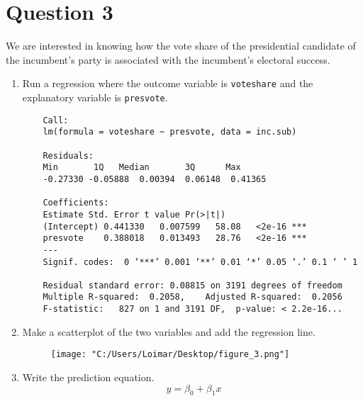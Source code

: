 \documentclass[12pt,letterpaper]{article}
\begin{document}
	\newpage	
\section*{Question 3}

\noindent We are interested in knowing how the vote share of the presidential candidate of the incumbent's party is associated with the incumbent's electoral success.
	\vspace{.25cm}
	\begin{enumerate}
		\item Run a regression where the outcome variable is \texttt{voteshare} and the explanatory variable is \texttt{presvote}.
		
		\begin{BVerbatim}
	Call:
	lm(formula = voteshare ~ presvote, data = inc.sub)
	
	Residuals:
	Min       1Q   Median       3Q      Max 
	-0.27330 -0.05888  0.00394  0.06148  0.41365 
	
	Coefficients:
	Estimate Std. Error t value Pr(>|t|)    
	(Intercept) 0.441330   0.007599   58.08   <2e-16 ***
	presvote    0.388018   0.013493   28.76   <2e-16 ***
	---
	Signif. codes:  0 ‘***’ 0.001 ‘**’ 0.01 ‘*’ 0.05 ‘.’ 0.1 ‘ ’ 1
	
	Residual standard error: 0.08815 on 3191 degrees of freedom
	Multiple R-squared:  0.2058,	Adjusted R-squared:  0.2056 
	F-statistic:   827 on 1 and 3191 DF,  p-value: < 2.2e-16...
		\end{BVerbatim}
			\vspace{5cm}
		\item Make a scatterplot of the two variables and add the regression line.
			 
				\begin{figure}[h!]
				\centering
				\texttt{[image: "C:/Users/Loimar/Desktop/figure\_3.png"]}
				\label{fig:figure_3}
			\end{figure}
			\vspace{5cm}
		\item Write the prediction equation.
		\begin{equation}
			\ y = \beta_0 + \beta_1 x
		\end{equation}
	\end{enumerate}
	

\newpage	
\end{document}
